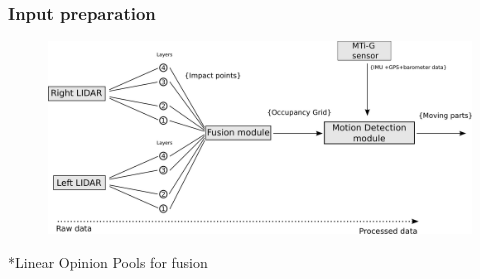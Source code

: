 \documentclass{beamer}
\begin{document}
	\begin{frame}
		\frametitle{Input preparation}
		\begin{figure}[h]
			\center
			\includegraphics[scale=0.18]{../img/fig:motion:framework}
		\end{figure}
		
		*Linear Opinion Pools \cite{ADARVE-2012-671211} for fusion
	
	\end{frame}
\end{document}
